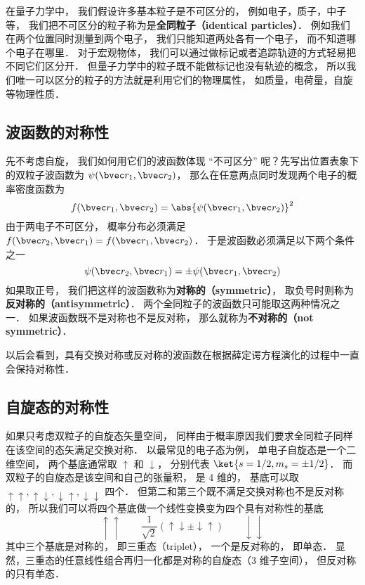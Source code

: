 
在量子力学中， 我们假设许多基本粒子是不可区分的， 例如电子，质子，中子等， 我们把不可区分的粒子称为是\textbf{全同粒子（identical particles）}． 例如我们在两个位置同时测量到两个电子， 我们只能知道两处各有一个电子， 而不知道哪个电子在哪里． 对于宏观物体， 我们可以通过做标记或者追踪轨迹的方式轻易把不同它们区分开． 但量子力学中的粒子既不能做标记也没有轨迹的概念， 所以我们唯一可以区分的粒子的方法就是利用它们的物理属性， 如质量，电荷量，自旋等物理性质．

\subsection{波函数的对称性}
先不考虑自旋， 我们如何用它们的波函数体现 “不可区分” 呢？先写出位置表象下的双粒子波函数为 $\psi(\bvec r_1, \bvec r_2)$， 那么在任意两点同时发现两个电子的概率密度函数为%
\begin{equation}
f(\bvec r_1, \bvec r_2) = \abs{\psi(\bvec r_1, \bvec r_2)}^2
\end{equation}
由于两电子不可区分， 概率分布必须满足 $f(\bvec r_2, \bvec r_1) = f(\bvec r_1, \bvec r_2)$． 于是波函数必须满足以下两个条件之一
\begin{equation}\label{IdPar_eq5}
\psi(\bvec r_2, \bvec r_1) = \pm \psi(\bvec r_1, \bvec r_2)
\end{equation}
如果取正号， 我们把这样的波函数称为\textbf{对称的（symmetric）}， 取负号时则称为\textbf{反对称的（antisymmetric）}． 两个全同粒子的波函数只可能取这两种情况之一． 如果波函数既不是对称也不是反对称， 那么就称为\textbf{不对称的（not symmetric）}．

以后会看到，具有交换对称或反对称的波函数在根据薛定谔方程演化的过程中一直会保持对称性． %

\subsection{自旋态的对称性}
如果只考虑双粒子的自旋态矢量空间， 同样由于概率原因我们要求全同粒子同样在该空间的态矢满足交换对称． 以最常见的电子态为例， 单电子自旋态是一个二维空间， 两个基底通常取 $\uparrow$ 和 $\downarrow$， 分别代表 $\ket{s=1/2,m_s=\pm 1/2}$． 而双粒子的自旋态是该空间和自己的张量积， 是 4 维的， 基底可以取 $\uparrow\uparrow, \uparrow\downarrow, \downarrow\uparrow, \downarrow\downarrow$ 四个． 但第二和第三个既不满足交换对称也不是反对称的， 所以我们可以将四个基底做一个线性变换变为四个具有对称性的基底
\begin{equation}\label{IdPar_eq1}
\uparrow\uparrow \qquad \frac{1}{\sqrt 2}(\uparrow\downarrow \pm \downarrow\uparrow) \qquad \downarrow\downarrow
\end{equation}
其中三个基底是对称的， 即三重态（triplet）， 一个是反对称的， 即单态． %
显然，三重态的任意线性组合再归一化都是对称的自旋态（3 维子空间）， 但反对称的只有单态．

